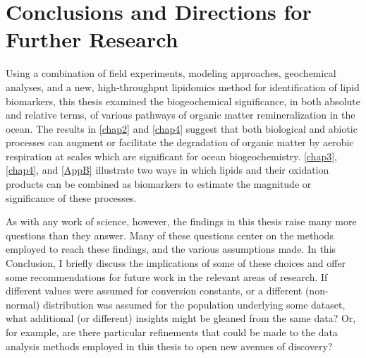 
\begingroup%
\makeatletter%
\cleardoublepage%
\let\newpage\relax%
\let\clearpage\relax%
\vspace*{\fill}%
\vspace*{\dimexpr-50\p@-\baselineskip}%
\chapter{Conclusions and Directions for Further Research}
\label{chap5}
\vspace*{\fill}%
\endgroup%

\clearpage
Using a combination of field experiments, modeling approaches, geochemical analyses, and a new, high-throughput lipidomics method for identification of lipid biomarkers, this thesis examined the biogeochemical significance, in both absolute and relative terms, of various pathways of organic matter remineralization in the ocean. The results in \autoref{chap2} and \autoref{chap4} suggest that both biological and abiotic processes can augment or facilitate the degradation of organic matter by aerobic respiration at scales which are significant for ocean biogeochemistry. \autoref{chap3}, \autoref{chap4}, and \autoref{AppB} illustrate two ways in which lipids and their oxidation products can be combined as biomarkers to estimate the magnitude or significance of these processes.

As with any work of science, however, the findings in this thesis raise many more questions than they answer. Many of these questions center on the methods employed to reach these findings, and the various assumptions made. In this Conclusion, I briefly discuss the implications of some of these choices and offer some recommendations for future work in the relevant areas of research. If different values were assumed for conversion constants, or a different (non-normal) distribution was assumed for the population underlying some dataset, what additional (or different) insights might be gleaned from the same data? Or, for example, are there particular refinements that could be made to the data analysis methods employed in this thesis to open new avenues of discovery?

